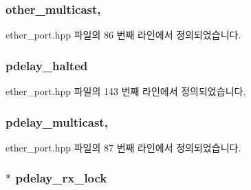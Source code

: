 \subsubsection[{\texorpdfstring{other\+\_\+multicast}{other_multicast}}]{ other\+\_\+multicast\hspace{0.3cm}{\ttfamily [static]}, {\ttfamily [private]}}\hypertarget{class_ether_port_a29f2f3c8a71254420cefb50ac5333be4}{}\label{class_ether_port_a29f2f3c8a71254420cefb50ac5333be4}


ether\+\_\+port.\+hpp 파일의 86 번째 라인에서 정의되었습니다.

\subsubsection[{\texorpdfstring{pdelay\+\_\+halted}{pdelay_halted}}]{ pdelay\+\_\+halted\hspace{0.3cm}{\ttfamily [private]}}\hypertarget{class_ether_port_a4f1a8de50cc802d20341857ad81b24ff}{}\label{class_ether_port_a4f1a8de50cc802d20341857ad81b24ff}


ether\+\_\+port.\+hpp 파일의 143 번째 라인에서 정의되었습니다.

\subsubsection[{\texorpdfstring{pdelay\+\_\+multicast}{pdelay_multicast}}]{ pdelay\+\_\+multicast\hspace{0.3cm}{\ttfamily [static]}, {\ttfamily [private]}}\hypertarget{class_ether_port_ad198525002835ea15ebe5ecda4a202c4}{}\label{class_ether_port_ad198525002835ea15ebe5ecda4a202c4}


ether\+\_\+port.\+hpp 파일의 87 번째 라인에서 정의되었습니다.

\subsubsection[{\texorpdfstring{pdelay\+\_\+rx\+\_\+lock}{pdelay_rx_lock}}]{$\ast$ pdelay\+\_\+rx\+\_\+lock\hspace{0.3cm}{\ttfamily [private]}}\hypertarget{class_ether_port_aac3e8dea9249220719fdb1b4568af804}{}\label{class_ether_port_aac3e8dea9249220719fdb1b4568af804}


